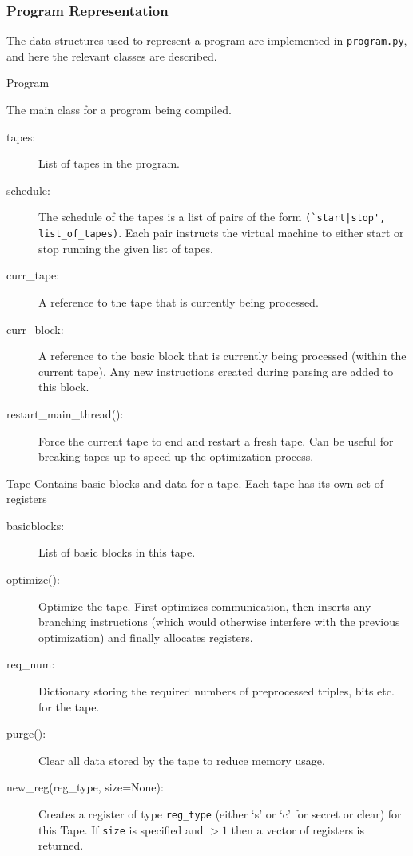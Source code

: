 \subsubsection{Program Representation}

The data structures used to represent a program are implemented in
\verb|program.py|, and here the relevant classes are described.

\begin{class}{Program}

The main class for a program being compiled.
\begin{description}
\item[tapes:] List of tapes in the program.
\item[schedule:] The schedule of the tapes is a list of pairs of the form
\verb+(`start|stop', list_of_tapes)+. Each pair instructs the virtual machine to
either start or stop running the given list of tapes.
\item[curr_tape:] A reference to the tape that is currently being processed.
\item[curr_block:] A reference to the basic block that is currently being
processed (within the current tape). Any new instructions created during
parsing are added to this block.
\item[restart_main_thread():] Force the current tape to end and restart a fresh
tape. Can be useful for breaking tapes up to speed up the optimization process.
\end{description}
\end{class}

\begin{class}{Tape}
Contains basic blocks and data for a tape. Each tape has its own set of
registers
\begin{description}
\item[basicblocks:] List of basic blocks in this tape.
\item[optimize():] Optimize the tape. First optimizes communication, then
inserts any branching instructions (which would otherwise interfere with the
previous optimization) and finally allocates registers.
\item[req_num:] Dictionary storing the required numbers of preprocessed
triples, bits etc. for the tape.
\item[purge():] Clear all data stored by the tape to reduce memory usage.
\item[new_reg(reg_type, size=None):] Creates a register of type \verb|reg_type|
(either `s' or `c' for secret or clear)
for this Tape. If \verb|size| is specified and $> 1$ then a vector of registers
is returned.
\end{description}
\end{class}


